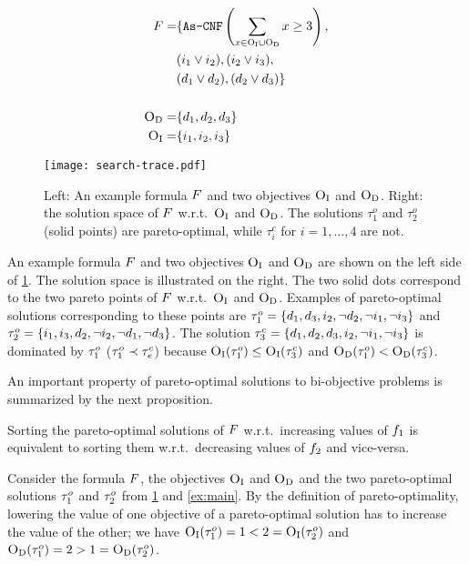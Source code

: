 \begin{figure}
  \begin{minipage}{0.36\textwidth}
  \footnotesize
  \begin{align*}
  F = &\{ \texttt{As-CNF}\left(\sum_ {x \in \textsc{O}_{\text{I}} \cup \textsc{O}_{\text{D}}} x \geq 3 \right), \\
  			&(i_1 \lor i_2),  (i_2 \lor i_3), \\
		 &(d_1 \lor d_2), (d_2 \lor d_3) \} \\ \\
  \textsc{O}_{\text{D}} =&\{ d_1,d_2, d_3\}   \\ 
  \textsc{O}_{\text{I}} =&\{ i_1,i_2, i_3\}  
  \end{align*}
  \end{minipage}
  \;
  \begin{minipage}{0.6\textwidth}
    \texttt{[image: search-trace.pdf]}
  \end{minipage}
  \caption{Left: An example formula $F$ and two objectives $\textsc{O}_{\text{I}}$ and $\textsc{O}_{\text{D}}$.
    Right: the solution space of $F$ w.r.t.\ $\textsc{O}_{\text{I}}$ and $\textsc{O}_{\text{D}}$.
    The solutions $\tau^o_1$ and $\tau^o_2$ (solid points) are pareto-optimal, while $\tau^c_i$ for $i=1,\ldots,4$ are not.\label{fig:search-trace}}
\end{figure}
\begin{example}\label{ex:main}
  An example formula $F$ and two objectives $\textsc{O}_{\text{I}}$ and $\textsc{O}_{\text{D}}$ are shown on the left side of \cref{fig:search-trace}. 
  The solution space is illustrated on the right.
  The two solid dots correspond to the two pareto points of $F$ w.r.t.\ $\textsc{O}_{\text{I}}$ and $\textsc{O}_{\text{D}}$. 
  Examples of pareto-optimal solutions corresponding to these points are $\tau^o_1 = \{d_1, d_3, i_2, \lnot d_2, \lnot i_1, \lnot i_3\}$ and $\tau^o_2 = \{i_1, i_3, d_2, \lnot i_2, \lnot d_1, \lnot d_3\}$.
  The solution $\tau^c_3 = \{d_1, d_2, d_3, i_2, \lnot i_1, \lnot i_3\}$ is dominated by $\tau^o_1$ ($\tau^o_1 \prec \tau^c_e$) because $\textsc{O}_{\text{I}}(\tau^o_1) \leq \textsc{O}_{\text{I}}(\tau^c_3)$ and $\textsc{O}_{\text{D}}(\tau^o_1) < \textsc{O}_{\text{D}}(\tau^c_3)$.
\end{example}

An important property of pareto-optimal solutions to bi-objective problems is summarized by the next proposition.
\begin{proposition} \label{prop:biobjective}
  Sorting the pareto-optimal solutions of $F$ w.r.t.\ increasing values of $f_1$ is equivalent to sorting them w.r.t.\ decreasing values of $f_2$ and vice-versa.
\end{proposition}

\begin{example}
  Consider the formula $F$, the objectives $\textsc{O}_{\text{I}}$ and $\textsc{O}_{\text{D}}$ and the two pareto-optimal solutions $\tau^o_1$ and $\tau^o_2$ from \cref{fig:search-trace} and \cref{ex:main}.
  By the definition of pareto-optimality, lowering the value of one objective of a pareto-optimal solution has to increase the value of the other;
  we have $\textsc{O}_{\text{I}}(\tau^o_1) = 1 < 2 = \textsc{O}_{\text{I}}(\tau^o_2)$ and $\textsc{O}_{\text{D}}(\tau^o_1) = 2 > 1 = \textsc{O}_{\text{D}}(\tau^o_2)$.
\end{example}